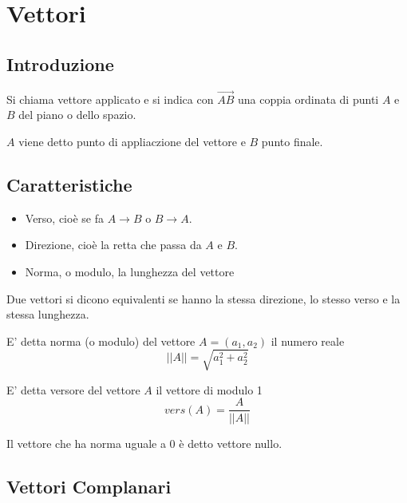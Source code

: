 \chapter{Vettori}

\section{Introduzione}

\begin{definition}
Si chiama vettore applicato e si indica con $\vec{AB}$ una coppia ordinata di punti $A$ e $B$ del piano o dello spazio.
\end{definition}

\begin{definition}
$A$ viene detto punto di appliaczione del vettore e $B$ punto finale.
\end{definition}

\section{Caratteristiche}

\begin{itemize}
\item Verso, cioè se fa $A \to B$ o $B \to A$.
\item Direzione, cioè la retta che passa da $A$ e $B$.
\item Norma, o modulo, la lunghezza del vettore
\end{itemize}

\begin{definition}
Due vettori si dicono equivalenti se hanno la stessa direzione, lo stesso verso e la stessa lunghezza.
\end{definition}

\begin{definition}[Norma]
E' detta norma (o modulo) del vettore $A=(a_1,a_2)$ il numero reale $$||A|| = \sqrt{a_1^2 + a_2^2}$$
\end{definition}

\begin{definition}[Versore]
E' detta versore del vettore $A$ il vettore di modulo 1 $$vers(A)=\frac{A}{||A||}$$
\end{definition}

\begin{definition}
Il vettore che ha norma uguale a 0 è detto vettore nullo.
\end{definition}

\section{Vettori Complanari}

